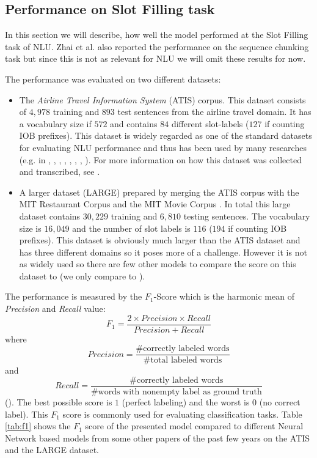 \documentclass[twoside,11pt,a4paper]{article}
\theoremstyle{break}
\begin{document}
\subsection{Performance on Slot Filling task}
In this section we will describe, how well the model performed at the Slot Filling task of NLU. Zhai et al. also reported the performance on the sequence chunking task but since this is not as relevant for NLU we will omit these results for now.\par
The performance was evaluated on two different datasets:
\begin{itemize}
	\item The \textit{Airline Travel Information System} (ATIS) corpus. This dataset consists of $4,978$ training and $893$ test sentences from the airline travel domain. It has a vocabulary size if $572$ and contains $84$ different slot-labels ($127$ if counting IOB prefixes). This dataset is widely regarded as one of the standard datasets for evaluating NLU performance and thus has been used by many researches (e.g. in \cite{goo:2018}, \cite{kurata:2016}, \cite{mesnil:2015}, \cite{mesnil:2013}, \cite{ravuri:2015}, \cite{yao:2013}, \cite{zhai:2017},  \cite{zhang:2016}). For more information on how this dataset was collected and transcribed, see \cite{hemphill:1990}.
	\item A larger dataset (LARGE) prepared by merging the ATIS corpus with the MIT Restaurant Corpus and the MIT Movie Corpus \cite{liu:2013a} \cite{liu:2013b}. In total this large dataset contains $30,229$ training and $6,810$ testing sentences. The vocabulary size is $16,049$ and the number of slot labels is $116$ ($194$ if counting IOB prefixes). This dataset is obviously much larger than the ATIS dataset and has three different domains so it poses more of a challenge. However it is not as widely used so there are few other models to compare the score on this dataset to (we only compare to \cite{kurata:2016}).
\end{itemize}
The performance is measured by the $F_1$-Score which is the harmonic mean of \textit{Precision} and \textit{Recall} value:
\[
	F_1 = \frac{2 \times Precision \times Recall}{Precision + Recall}
\]
where
\[
	Precision = \frac{\# \text{correctly labeled words}}{\# \text{total labeled words}}
\]
and
\[
	Recall = \frac{\# \text{correctly labeled words}}{\# \text{words with nonempty label as ground truth}}
\]
(\cite{rijsbergen:1979}). The best possible score is $1$ (perfect labeling) and the worst is $0$ (no correct label). This $F_1$ score is commonly used for evaluating classification tasks. Table \ref{tab:f1} shows the $F_1$ score of the presented model compared to different Neural Network based  models from some other papers of the past few years on the ATIS and the LARGE dataset.
\end{document}
